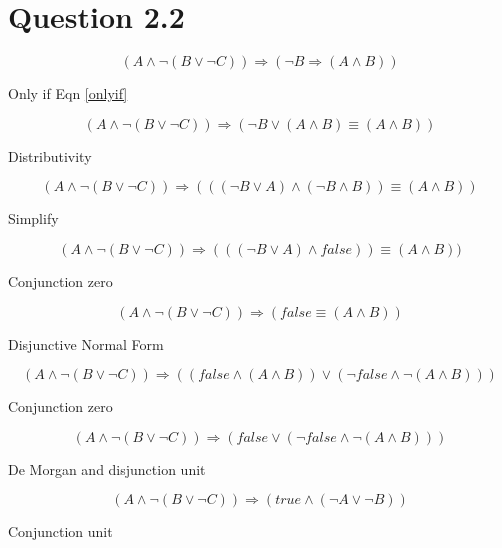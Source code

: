 \documentclass[10pt,a4paper]{article}
\begin{document}
\section{Question 2.2}

\begin{equation}
 (A \wedge \neg(B\vee \neg C)) \Rightarrow (\neg B \Rightarrow (A\wedge B))
\end{equation}

Only if Eqn \ref{onlyif}

\begin{equation}
 (A \wedge \neg(B\vee \neg C)) \Rightarrow (\neg B \vee (A\wedge B)\equiv (A\wedge B))
\end{equation}

Distributivity 

\begin{equation}
 (A \wedge \neg(B\vee \neg C)) \Rightarrow (((\neg B \vee A)\wedge(\neg B \wedge B)) \equiv (A\wedge B))
\end{equation}

Simplify 

\begin{equation}
 (A \wedge \neg(B\vee \neg C)) \Rightarrow (((\neg B \vee A)\wedge false)) \equiv (A\wedge B))
\end{equation}

Conjunction zero

\begin{equation}
 (A \wedge \neg(B\vee \neg C)) \Rightarrow ( false \equiv (A\wedge B))
\end{equation}

Disjunctive Normal Form

\begin{equation}
 (A \wedge \neg(B\vee \neg C)) \Rightarrow (( false \wedge (A\wedge B))\vee (\neg false \wedge \neg(A\wedge B)))
\end{equation}

Conjunction zero

\begin{equation}
 (A \wedge \neg(B\vee \neg C)) \Rightarrow (false \vee (\neg false \wedge \neg(A\wedge B)))
\end{equation}

De Morgan and disjunction unit

\begin{equation}
 (A \wedge \neg(B\vee \neg C)) \Rightarrow (true \wedge (\neg A\vee \neg B))
\end{equation}

Conjunction unit
\end{document}
